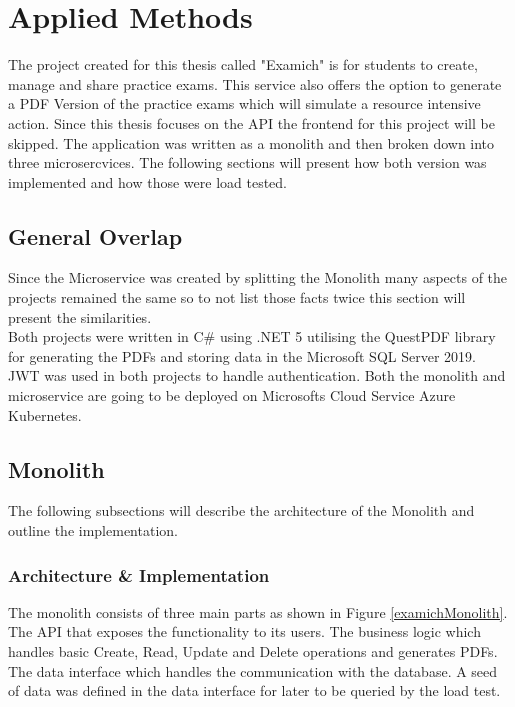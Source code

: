 \documentclass[BIF,Bachelor,nenglish]{twbook}%
\begin{document}
\clearpage
\chapter{Applied Methods}
The project created for this thesis called "Examich" is for students to create, manage and share practice exams. This service also offers the option to generate a PDF Version of the practice exams which will simulate a resource intensive action. Since this thesis focuses on the \ac{API} the frontend for this project will be skipped. The application was written as a monolith and then broken down into three microsercvices. The following sections will present how both version was implemented and how those were load tested.

\section{General Overlap}
Since the Microservice was created by splitting the Monolith many aspects of the projects remained the same so to not list those facts twice this section will present the similarities.
\\
\noindent
Both projects were written in C\# using .NET 5 utilising the QuestPDF library for generating the PDFs and storing data in the Microsoft SQL Server 2019. \ac{JWT} was used in both projects to handle authentication. Both the monolith and microservice are going to be deployed on Microsofts Cloud Service Azure Kubernetes.

\section{Monolith}
The following subsections will describe the architecture of the Monolith and outline the implementation.

\subsection{Architecture \& Implementation}
The monolith consists of three main parts as shown in Figure \ref{examichMonolith}. The \ac{API} that exposes the functionality to its users. The business logic which handles basic Create, Read, Update and Delete operations and generates PDFs. The data interface which handles the communication with the database. A seed of data was defined in the data interface for later to be queried by the load test.
\end{document}
